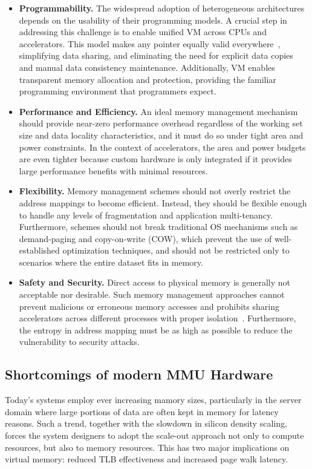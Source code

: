 \begin{itemize}
        \item \textbf{Programmability.} The widespread adoption of heterogeneous architectures depends on the usability of their programming models. A crucial step in addressing this challenge is to enable unified VM across CPUs and accelerators. This model makes any pointer equally valid everywhere~\cite{hsa}, simplifying data sharing, and eliminating the need for explicit data copies and manual data consistency maintenance. Additionally, VM enables transparent memory allocation and protection, providing the familiar programming environment that programmers expect.
        \item \textbf{Performance and Efficiency.} An ideal memory management mechanism should provide near-zero performance overhead regardless of the working set size and data locality characteristics, and it must do so under tight area and power constraints. In the context of accelerators, the area and power budgets are even tighter because custom hardware is only integrated if it provides large performance benefits with minimal resources.
        \item \textbf{Flexibility.} Memory management schemes should not overly restrict the address mappings to become efficient. Instead, they should be flexible enough to handle any levels of fragmentation and application multi-tenancy. Furthermore, schemes should not break traditional OS mechanisms such as demand-paging and copy-on-write (COW), which prevent the use of well-established optimization techniques, and should not be restricted only to scenarios where the entire dataset fits in memory.
        \item \textbf{Safety and Security.} Direct access to physical memory is generally not acceptable nor desirable. Such memory management approaches cannot prevent malicious or erroneous memory accesses and prohibits sharing accelerators across different processes with proper isolation~\cite{haria:devirtualizing}. Furthermore, the entropy in address mapping must be as high as possible to reduce the vulnerability to security attacks.
\end{itemize}


\subsection{Shortcomings of modern MMU Hardware}
Today's systems employ ever increasing mamory sizes, particularly in the server domain where large portions of data are often kept in memory for latency reasons. Such a trend, together with the slowdown in silicon density scaling, forces the system designers to adopt the scale-out approach not only to compute resources, but also to memory resources. This has two major implications on virtual memory: reduced TLB effectiveness and increased page walk latency. 

